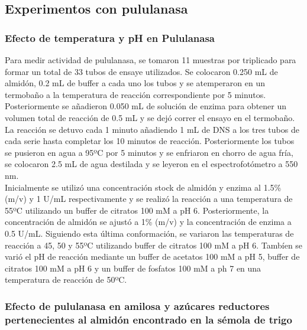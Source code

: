 \documentclass{article}
\begin{document}
\subsection{ Experimentos con pululanasa}

\subsubsection{Efecto de temperatura y pH en Pululanasa}
	Para medir actividad de pululanasa, se tomaron 11 muestras por triplicado para formar un total de 33 tubos de ensaye utilizados. Se colocaron 0.250 mL de almidón,  0.2 mL de buffer a cada uno los tubos y se atemperaron en un termobaño a la temperatura de reacción correspondiente por 5 minutos. Posteriormente se añadieron 0.050 mL de solución de enzima para obtener un volumen total de reacción de 0.5 mL y se dejó correr el ensayo en el termobaño. La reacción se detuvo cada 1 minuto añadiendo 1 mL de DNS a los tres tubos de cada serie hasta completar los 10 minutos de reacción. Posteriormente los tubos se pusieron en agua a 95ºC por 5 minutos y se enfriaron en chorro de agua fría, se colocaron 2.5 mL de agua destilada y se leyeron en el espectrofotómetro a 550 nm.\\
	
	Inicialmente se utilizó una concentración stock de almidón y enzima al 1.5\% (m/v) y 1 U/mL respectivamente y se realizó la reacción a una temperatura de 55ºC utilizando un buffer de citratos 100 mM a pH 6. Posteriormente, la concentración de almidón se ajustó a 1\% (m/v) y la concentración de enzima a 0.5 U/mL. Siguiendo esta última conformación, se variaron las temperaturas de reacción a 45, 50 y 55ºC utilizando buffer de citratos 100 mM a pH 6. Tambíen se varió el pH de reacción mediante un buffer de acetatos 100 mM a pH 5, buffer de citratos 100 mM a pH 6 y un buffer de fosfatos 100 mM a ph 7 en una temperatura de reacción de 50ºC.
	
\subsubsection{Efecto de pululanasa en amilosa y azúcares reductores pertenecientes al almidón encontrado en la sémola de trigo}	
\end{document}
